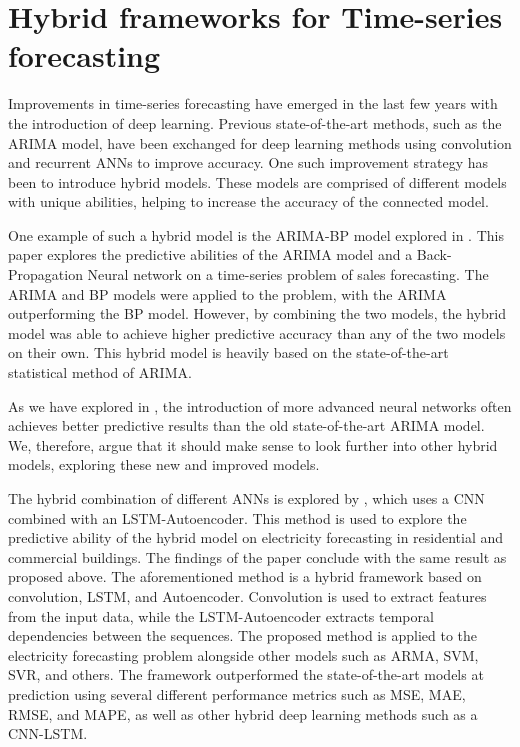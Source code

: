 \section{Hybrid frameworks for Time-series forecasting}
\label{section:RelatedWork:Hybrid}

Improvements in time-series forecasting have emerged in the last few years with the introduction of deep learning.
Previous state-of-the-art methods, such as the ARIMA model, have been exchanged for deep learning methods using convolution and recurrent ANNs to improve accuracy.
One such improvement strategy has been to introduce hybrid models.
These models are comprised of different models with unique abilities, helping to increase the accuracy of the connected model.


One example of such a hybrid model is the ARIMA-BP model explored in \cite{Bowen2020}.
This paper explores the predictive abilities of the ARIMA model and a Back-Propagation Neural network on a time-series problem of sales forecasting.
The ARIMA and BP models were applied to the problem, with the ARIMA outperforming the BP model.
However, by combining the two models, the hybrid model was able to achieve higher predictive accuracy than any of the two models on their own.
This hybrid model is heavily based on the state-of-the-art statistical method of ARIMA.

As we have explored in , the introduction of more advanced neural networks often achieves better predictive results than the old state-of-the-art ARIMA model.
We, therefore, argue that it should make sense to look further into other hybrid models, exploring these new and improved models.


The hybrid combination of different ANNs is explored by \cite{Khan2020}, which uses a CNN combined with an LSTM-Autoencoder.
This method is used to explore the predictive ability of the hybrid model on electricity forecasting in residential and commercial buildings.
The findings of the paper conclude with the same result as proposed above.
The aforementioned method is a hybrid framework based on convolution, LSTM, and Autoencoder.
Convolution is used to extract features from the input data, while the LSTM-Autoencoder extracts temporal dependencies between the sequences.
The proposed method is applied to the electricity forecasting problem alongside other models such as ARMA, SVM, SVR, and others.
The framework outperformed the state-of-the-art models at prediction using several different performance metrics such as MSE, MAE, RMSE, and MAPE,
as well as other hybrid deep learning methods such as a CNN-LSTM.


